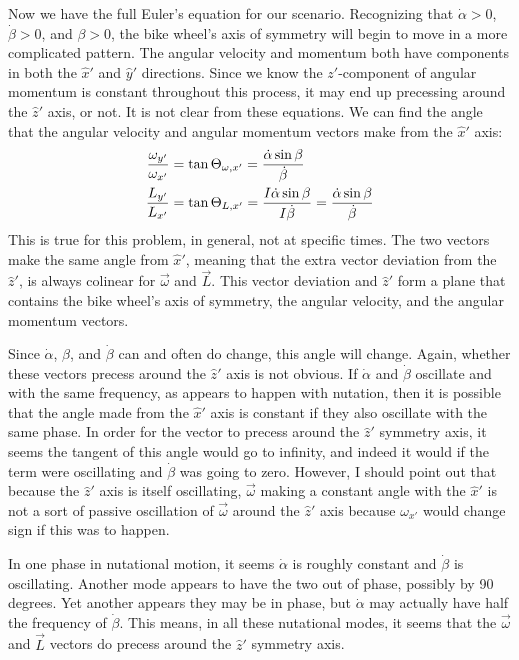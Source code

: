 \documentclass[10pt]{article}
\begin{document}
Now we have the full Euler's equation for our scenario. Recognizing 
that $\dot\alpha>0$, $\dot\beta>0$, and $\beta>0$, the 
bike wheel's axis of symmetry will begin to move 
in a more complicated pattern. The angular 
velocity and momentum both have components in both the $\hat{x}'$ and 
$\hat{y}'$ directions. Since we know the $z'$-component of angular momentum is 
constant throughout this process, it may end up precessing around the 
$\hat{z}'$ axis, or not. It is not clear from these equations. We 
can find the angle that the 
angular velocity and angular momentum vectors make from the $\hat{x}'$ axis:
\begin{align}
    \frac{\omega_{y'}}{\omega_{x'}} &= \tan\Theta_{\omega,x'} = 
        \frac{\dot\alpha\sin\beta}{\dot\beta} \notag \\
    \frac{L_{y'}}{L_{x'}} &= \tan\Theta_{L,x'} =
        \frac{I\dot\alpha\sin\beta}{I\dot\beta} = 
        \frac{\dot\alpha\sin\beta}{\dot\beta} \label{xangles}
\end{align}
This is true for this problem, in general, not at 
specific times. The two vectors make the same 
angle from $\hat{x}'$, meaning that the extra vector deviation
from the $\hat{z}'$, is always colinear for $\vec{\omega}$ and $\vec{L}$. 
This vector deviation and $\hat{z}'$ form a plane that contains the 
bike wheel's axis of symmetry, the angular velocity, and the 
angular momentum vectors. 

Since $\dot\alpha$, $\beta$, and $\dot\beta$ can 
and often do change, this angle will change. Again, 
whether these vectors precess around the $\hat{z}'$ axis
 is not obvious. If $\dot\alpha$ and $\dot\beta$ oscillate and 
with the same frequency, as appears to happen with nutation, then it is 
possible that the angle made from the $\hat{x}'$ axis is constant 
if they also oscillate with the same phase. In order 
for the vector to precess around the $\hat{z}'$ symmetry axis, 
it seems the tangent of this angle would go to infinity, and indeed it would 
if the term were oscillating and $\dot\beta$ was going to zero. However, 
I should point out that because the $\hat{z}'$ axis is itself oscillating,
$\vec\omega$ making a constant angle with the $\hat{x}'$ is not a 
sort of passive oscillation of $\vec\omega$ around the $\hat{z}'$ axis 
because $\omega_{x'}$ would change sign if this was to happen.

In one phase in nutational motion, it seems $\dot\alpha$ is roughly 
constant and $\dot\beta$ is oscillating. Another 
mode appears to have the two out of phase, possibly by 90 degrees. Yet 
another appears they may be in phase, but $\dot\alpha$ may actually 
have half the frequency of $\dot\beta$. This means, in all these 
nutational modes, it seems that the $\vec\omega$ and $\vec{L}$ vectors 
do precess around the $\hat{z}'$ symmetry axis.
\end{document}
